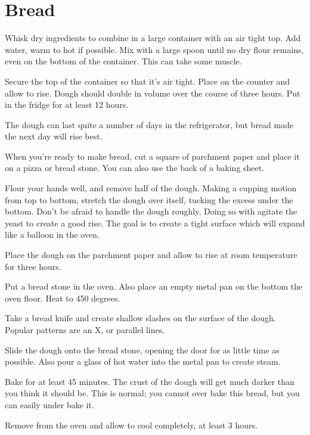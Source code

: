 \section{Bread}
\begin{recipe}


Whisk dry ingredients to combine in a large container with an air tight top. Add water, warm to hot if possible. Mix with a large spoon until no dry flour remains, even on the bottom of the container. This can take some muscle.

Secure the top of the container so that it's air tight. Place on the counter and allow to rise. Dough should double in volume over the course of three hours. Put in the fridge for at least 12 hours.

The dough can last quite a number of days in the refrigerator, but bread made the next day will rise best.

When you're ready to make bread, cut a square of parchment paper and place it on a pizza or bread stone. You can also use the back of a baking sheet.

Flour your hands well, and remove half of the dough. Making a cupping motion from top to bottom, stretch the dough over itself, tucking the excess under the bottom. Don't be afraid to handle the dough roughly, Doing so with agitate the yeast to create a good rise. The goal is to create a tight surface which will expand like a balloon in the oven.

Place the dough on the parchment paper and allow to rise at room temperature for three hours.

Put a bread stone in the oven. Also place an empty metal pan on the bottom the oven floor. Heat to 450 degrees.

Take a bread knife and create shallow slashes on the surface of the dough. Popular patterns are an X, or parallel lines.

Slide the dough onto the bread stone, opening the door for as little time as possible. Also pour a glass of hot water into the metal pan to create steam.

Bake for at least 45 minutes. The crust of the dough will get much darker than you think it should be. This is normal; you cannot over bake this bread, but you can easily under bake it.

Remove from the oven and allow to cool completely, at least 3 hours.


\end{recipe}
